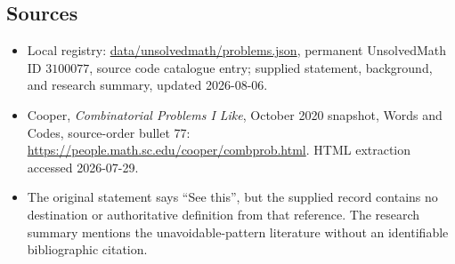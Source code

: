 \documentclass[11pt]{article}
\begin{document}
\subsection{Sources}
\begin{itemize}
\item Local registry: \url{data/unsolvedmath/problems.json}, permanent UnsolvedMath ID \(3100077\), source code catalogue entry; supplied statement, background, and research summary, updated 2026-08-06.
\item Cooper, \emph{Combinatorial Problems I Like}, October 2020 snapshot, Words and Codes, source-order bullet 77: \url{https://people.math.sc.edu/cooper/combprob.html}. HTML extraction accessed 2026-07-29.
\item The original statement says ``See this'', but the supplied record contains no destination or authoritative definition from that reference. The research summary mentions the unavoidable-pattern literature without an identifiable bibliographic citation.
\end{itemize}
\end{document}
